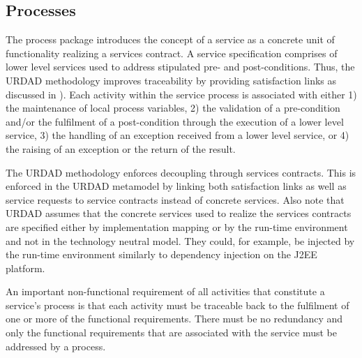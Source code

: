 \subsection{Processes}

The process package introduces the concept of a service as a concrete unit of functionality realizing a services contract. A service specification comprises of lower level services used to address stipulated pre- and post-conditions. Thus, the URDAD methodology improves traceability by providing satisfaction links as discussed in \cite{ramesh_toward_2001}). Each activity within the service process is associated with either 1) the maintenance of local process variables, 2) the validation of a pre-condition and/or the fulfilment of a post-condition through the execution of a lower level service, 3) the handling of an exception received from a lower level service, or 4) the raising of an exception or the return of the result.

The URDAD methodology enforces decoupling through services contracts. This is enforced in the URDAD metamodel by linking both satisfaction links as well as service requests to service contracts instead of concrete services. Also note that URDAD assumes that the concrete services used to realize the services contracts are specified either by implementation mapping or by the run-time environment and not in the technology neutral model. They could, for example, be injected by the run-time environment similarly to dependency injection on the J2EE platform.

An important non-functional requirement of all activities that constitute a service's process is that each activity must be traceable back to the fulfilment of one or more of the functional requirements. There must be no redundancy and only the functional requirements that are associated with the service must be addressed by a process.

